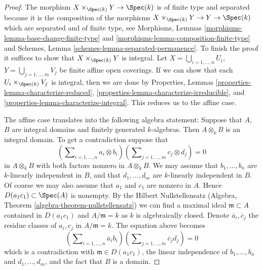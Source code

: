 \begin{proof}
The morphism $X \times_{\Spec(k)} Y \to \Spec(k)$ is of
finite type and separated because it is the composition of the
morphisms $X \times_{\Spec(k)} Y \to Y \to \Spec(k)$
which are separated and of finite type, see
Morphisms, Lemmas \ref{morphisms-lemma-base-change-finite-type} and
\ref{morphisms-lemma-composition-finite-type}
and
Schemes, Lemma \ref{schemes-lemma-separated-permanence}.
To finish the proof it suffices to show that $X \times_{\Spec(k)} Y$
is integral.
Let $X = \bigcup_{i = 1, \ldots, n} U_i$,
$Y = \bigcup_{j = 1, \ldots, m} V_j$ be finite affine open coverings.
If we can show that each $U_i \times_{\Spec(k)} V_j$ is integral,
then we are done by
Properties, Lemmas \ref{properties-lemma-characterize-reduced},
\ref{properties-lemma-characterize-irreducible}, and
\ref{properties-lemma-characterize-integral}.
This reduces us to the affine case.

\medskip\noindent
The affine case translates into the following algebra statement: Suppose
that $A$, $B$ are integral domains and finitely generated $k$-algebras.
Then $A \otimes_k B$ is an integral domain. To get a contradiction suppose that
$$
(\sum\nolimits_{i = 1, \ldots, n} a_i \otimes b_i)
(\sum\nolimits_{j = 1, \ldots, m} c_j \otimes d_j) = 0
$$
in $A \otimes_k B$ with both factors nonzero in $A \otimes_k B$.
We may assume that $b_1, \ldots, b_n$ are $k$-linearly
independent in $B$, and that $d_1, \ldots, d_m$ are $k$-linearly independent
in $B$. Of course we may also assume that $a_1$ and $c_1$ are nonzero
in $A$. Hence $D(a_1c_1) \subset \Spec(A)$ is nonempty. By the
Hilbert Nullstellensatz
(Algebra, Theorem \ref{algebra-theorem-nullstellensatz})
we can find a maximal ideal $\mathfrak m \subset A$ contained in
$D(a_1c_1)$ and $A/\mathfrak m = k$ as $k$ is algebraically closed.
Denote $\overline{a}_i, \overline{c}_j$ the residue classes of
$a_i, c_j$ in $A/\mathfrak m = k$. The equation above becomes
$$
(\sum\nolimits_{i = 1, \ldots, n} \overline{a}_i b_i)
(\sum\nolimits_{j = 1, \ldots, m} \overline{c}_j d_j) = 0
$$
which is a contradiction with
$\mathfrak m \in D(a_1c_1)$, the linear independence of
$b_1, \ldots, b_n$ and $d_1, \ldots, d_m$, and the fact that $B$ is a domain.
\end{proof}






